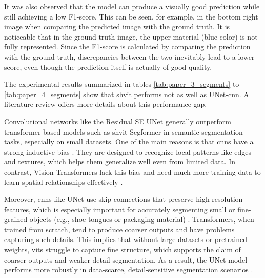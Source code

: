 \medskip

It was also observed that the model can produce a visually good prediction while still achieving a low F1-score. This can be seen, for example, in the bottom right image when comparing the predicted image with the ground truth. It is noticeable that in the ground truth image, the upper material (blue color) is not fully represented. Since the F1-score is calculated by comparing the prediction with the ground truth, discrepancies between the two inevitably lead to a lower score, even though the prediction itself is actually of good quality.

\bigskip

The experimental results summarized in tables \ref{tab:paper_3_segments} to \ref{tab:paper_4_segments} show that \gls{shvit} performs not as well as UNet-\gls{cnn}. A literature review offers more details about this performance gap.

\medskip

Convolutional networks like the Residual SE UNet generally outperform transformer-based models such as \gls{shvit} Segformer in semantic segmentation tasks, especially on small datasets. One of the main reasons is that \glspl{cnn} have a strong inductive bias \cite{Dosovitskiy2021ViT}. They are designed to recognize local patterns like edges and textures, which helps them generalize well even from limited data. In contrast, Vision Transformers lack this bias and need much more training data to learn spatial relationships effectively \cite{ronneberger2015, steiner2022trainvitdataaugmentation}.

\medskip

Moreover, \glspl{cnn} like UNet use skip connections that preserve high-resolution features, which is especially important for accurately segmenting small or fine-grained objects (e.g., shoe tongues or packaging material) \cite{zhou2018unet}. Transformers, when trained from scratch, tend to produce coarser outputs and have problems capturing such details. This implies that without large datasets or pretrained weights, \glspl{vit} struggle to capture fine structure, which supports the claim of coarser outputs and weaker detail segmentation. As a result, the UNet model performs more robustly in data-scarce, detail-sensitive segmentation scenarios \cite{steiner2022trainvitdataaugmentation}.


